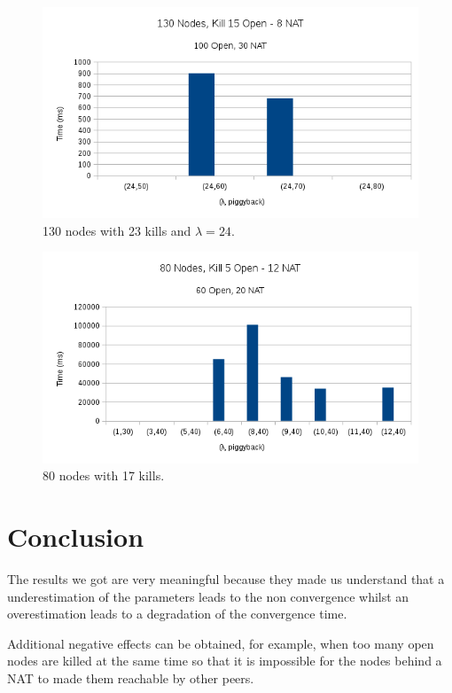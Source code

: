 \documentclass[10pt,a4paper]{proc}
\begin{document}
\begin{figure}
\centering
\includegraphics[scale=0.5]{metrics/kill15OpenFixedLamda.png}
\caption{130 nodes with 23 kills and $\lambda=24$.}
\label{kill15OpenFixed}
\end{figure}

\begin{figure}
\centering
\includegraphics[scale=0.5]{metrics/kill5Open.png}
\caption{80 nodes with 17 kills.}
\label{kill5Open}
\end{figure}

\section{Conclusion}

The results we got are very meaningful because they made us understand that a underestimation of the parameters leads to the non convergence whilst an overestimation leads to a degradation of the convergence time.

Additional negative effects can be obtained, for example, when too many open nodes are killed at the same time so that it is impossible for the nodes behind a NAT to made them reachable by other peers.
\end{document}
